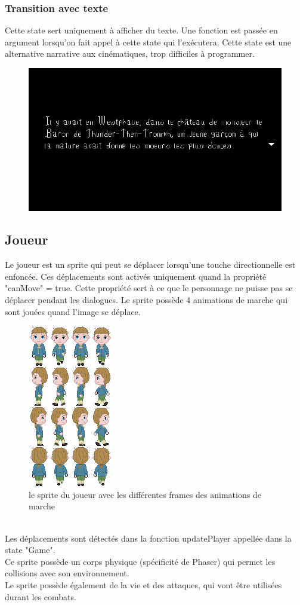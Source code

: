 \documentclass[11pt]{article}
\begin{document}
\subsubsection{Transition avec texte}
Cette state sert uniquement à afficher du texte. Une fonction est passée en argument lorsqu'on fait appel à cette state qui l'exécutera. Cette state est une alternative narrative aux cinématiques, trop difficiles à programmer.
\begin{figure}[h]
\includegraphics[scale=0.33]{introScreen}
\centering
\end{figure}  
\subsection{Joueur}
Le joueur est un sprite qui peut se déplacer lorsqu'une touche directionnelle est enfoncée. Ces déplacements sont activés uniquement quand la propriété "canMove" = true. Cette propriété sert à ce que le personnage ne puisse pas se déplacer pendant les dialogues. Le sprite possède 4 animations de marche qui sont jouées quand l'image se déplace.\\
\begin{figure}[h]
\includegraphics[scale=0.5]{candideSprite}
\centering
\caption{le sprite du joueur avec les différentes frames des animations de marche}
\end{figure}
\\Les déplacements sont détectés dans la fonction updatePlayer appellée dans la state "Game".
\\Ce sprite possède un corps physique (spécificité de Phaser) qui permet les collisions avec son environnement.
\\Le sprite possède également de la vie et des attaques, qui vont être utilisées durant les combats. 
\end{document}
